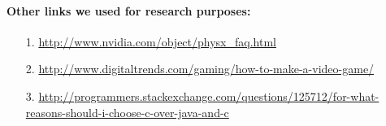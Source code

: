 \paragraph{\bfseries Other links we used for research purposes:}

\begin{itemize}
    \item[1.]{}{ \url{http://www.nvidia.com/object/physx_faq.html}}
    \item[2.]{}{ \url{http://www.digitaltrends.com/gaming/how-to-make-a-video-game/}}
    \item[3.]{}{ \url{http://programmers.stackexchange.com/questions/125712/for-what-reasons-should-i-choose-c-over-java-and-c}}
\end{itemize}


